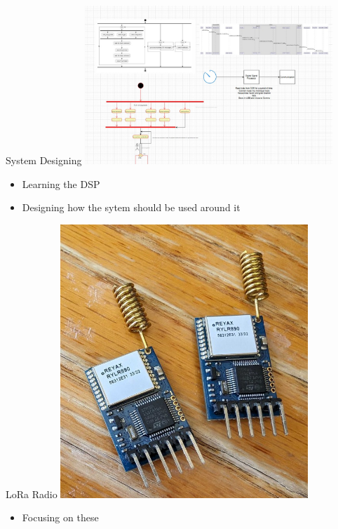 \begin{frame}{System Designing}
    \centering
    \includegraphics[height=0.7\textheight,width=0.7\textwidth,keepaspectratio]{images/rtt/diagrams.jpg}
    \begin{itemize}
        \item Learning the DSP
        \item Designing how the sytem should be used around it
    \end{itemize}
\end{frame}
\begin{frame}{LoRa Radio}
    \centering
    \includegraphics[height=0.7\textheight,width=0.7\textwidth,keepaspectratio]{images/rtt/LoRa.jpg}
    \begin{itemize}
        \item Focusing on these
    \end{itemize}
\end{frame}
